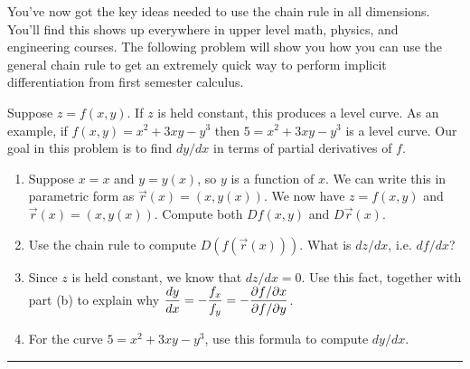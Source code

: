 You've now got the key ideas needed to use the chain rule in all dimensions. You'll find this shows up everywhere in upper level math, physics, and engineering courses. The following problem will show you how you can use the general chain rule to get an extremely quick way to perform implicit differentiation from first semester calculus.

\begin{problem}%
 Suppose $z=f(x,y)$.  If $z$ is held constant, this produces a level curve. As an example, if $f(x,y) = x^2+3xy-y^3$ then $5=x^2+3xy-y^3$ is a level curve. Our goal in this problem is to find $dy/dx$ in terms of partial derivatives of $f$.
\begin{enumerate}
 \item Suppose $x=x$ and $y=y(x)$, so $y$ is a function of $x$.  We can write this in parametric form as $\vec r(x) = (x,y(x))$. We now have $z=f(x,y)$ and $\vec r(x)=(x,y(x))$.  Compute both $Df(x,y)$ and $D\vec r(x)$. 
 \item Use the chain rule to compute $D(f(\vec r(x)))$. What is $dz/dx$, i.e. $df/dx$?
 \item Since $z$ is held constant, we know that $dz/dx=0$. Use this fact, together with part (b) to explain why $\displaystyle \frac{dy}{dx} = -\frac{f_x}{f_y} = -\frac{\partial f/ \partial x}{\partial f/ \partial y}$.
 \item For the curve $5=x^2+3xy-y^3$, use this formula to compute $dy/dx$.
\end{enumerate}
  
\hrule\end{problem}


